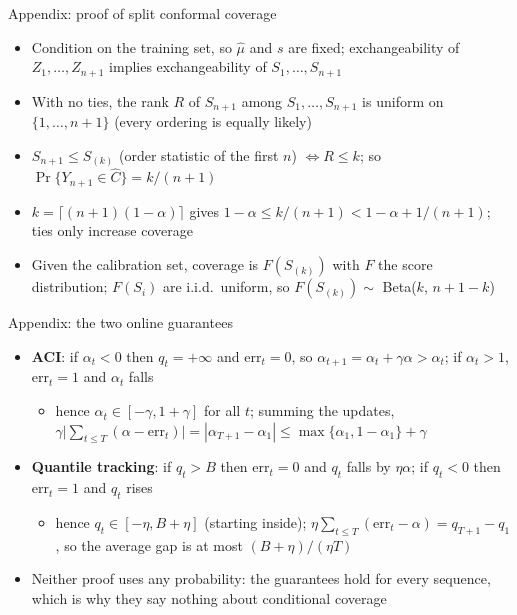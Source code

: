 \begin{frame}{Appendix: proof of split conformal coverage}
\hypertarget{atsapp1}{}
\itemsize{\small}
\begin{itemize}
    \item Condition on the training set, so $\hat\mu$ and $s$ are fixed; exchangeability of $Z_1, \dots, Z_{n+1}$ implies exchangeability of $S_1, \dots, S_{n+1}$
    \item With no ties, the rank $R$ of $S_{n+1}$ among $S_1, \dots, S_{n+1}$ is uniform on $\{1, \dots, n + 1\}$ (every ordering is equally likely)
    \item $S_{n+1} \le S_{(k)}$ (order statistic of the first $n$) $\iff R \le k$; so $\Pr\{Y_{n+1} \in \hat C\} = k/(n + 1)$
    \item $k = \lceil (n + 1)(1 - \alpha)\rceil$ gives $1 - \alpha \le k/(n + 1) < 1 - \alpha + 1/(n + 1)$; ties only increase coverage
    \item Given the calibration set, coverage is $F(S_{(k)})$ with $F$ the score distribution; $F(S_i)$ are i.i.d.\ uniform, so $F(S_{(k)}) \sim$ Beta($k$, $n + 1 - k$)
\end{itemize}
\end{frame}

\begin{frame}{Appendix: the two online guarantees}
\hypertarget{atsapp2}{}
\itemsize{\small}
\begin{itemize}
    \item \textbf{ACI}: if $\alpha_t < 0$ then $q_t = +\infty$ and $\mathrm{err}_t = 0$, so $\alpha_{t+1} = \alpha_t + \gamma\alpha > \alpha_t$; if $\alpha_t > 1$, $\mathrm{err}_t = 1$ and $\alpha_t$ falls
    \begin{itemize}
        \item hence $\alpha_t \in [-\gamma, 1 + \gamma]$ for all $t$; summing the updates, $\gamma\big|\sum_{t \le T}(\alpha - \mathrm{err}_t)\big| = |\alpha_{T+1} - \alpha_1| \le \max\{\alpha_1, 1 - \alpha_1\} + \gamma$
    \end{itemize}
    \item \textbf{Quantile tracking}: if $q_t > B$ then $\mathrm{err}_t = 0$ and $q_t$ falls by $\eta\alpha$; if $q_t < 0$ then $\mathrm{err}_t = 1$ and $q_t$ rises
    \begin{itemize}
        \item hence $q_t \in [-\eta, B + \eta]$ (starting inside); $\eta\sum_{t \le T}(\mathrm{err}_t - \alpha) = q_{T+1} - q_1$, so the average gap is at most $(B + \eta)/(\eta T)$
    \end{itemize}
    \item Neither proof uses any probability: the guarantees hold for every sequence, which is why they say nothing about conditional coverage
\end{itemize}
\end{frame}


